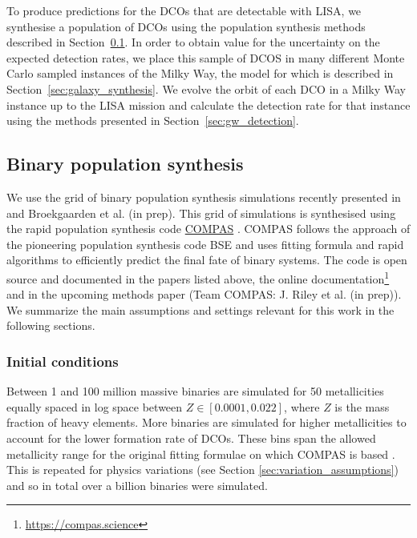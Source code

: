 To produce predictions for the DCOs that are detectable with LISA, we synthesise a population of DCOs using the population synthesis methods described in Section~\ref{sec:COMPAS_explained}. In order to obtain value for the uncertainty on the expected detection rates, we place this sample of DCOS in many different Monte Carlo sampled instances of the Milky Way, the model for which is described in Section~\ref{sec:galaxy_synthesis}. We evolve the orbit of each DCO in a Milky Way instance up to the LISA mission and calculate the detection rate for that instance using the methods presented in Section~\ref{sec:gw_detection}.

\subsection{Binary population synthesis}\label{sec:COMPAS_explained}

We use the grid of binary population synthesis simulations recently presented in \citet{Broekgaarden+2021} and Broekgaarden et al. (in prep). This grid of simulations is synthesised using the rapid population synthesis code \href{https://compas.science}{COMPAS} \citep{Stevenson+2017, Vigna-Gomez+2018, Stevenson+2019}. COMPAS follows the approach of the pioneering population synthesis code BSE \citep{Hurley+2000,Hurley+2002} and uses fitting formula and rapid algorithms to efficiently predict the final fate of binary systems. The code is open source and documented in the papers listed above, the online documentation\footnote{\url{https://compas.science}} and in the upcoming methods paper (Team COMPAS: J. Riley et al. (in prep)). We summarize the main assumptions and settings relevant for this work in the following sections.

\subsubsection{Initial conditions}

Between 1 and 100 million massive binaries are simulated for 50 metallicities equally spaced in log space between $Z \in [0.0001, 0.022]$, where $Z$ is the mass fraction of heavy elements. More binaries are simulated for higher metallicities to account for the lower formation rate of DCOs. These bins span the allowed metallicity range for the original fitting formulae on which COMPAS is based \citep{Hurley+2000}. This is repeated for \nMinusOneModels{} physics variations (see Section \ref{sec:variation_assumptions}) and so in total over a billion binaries were simulated.

